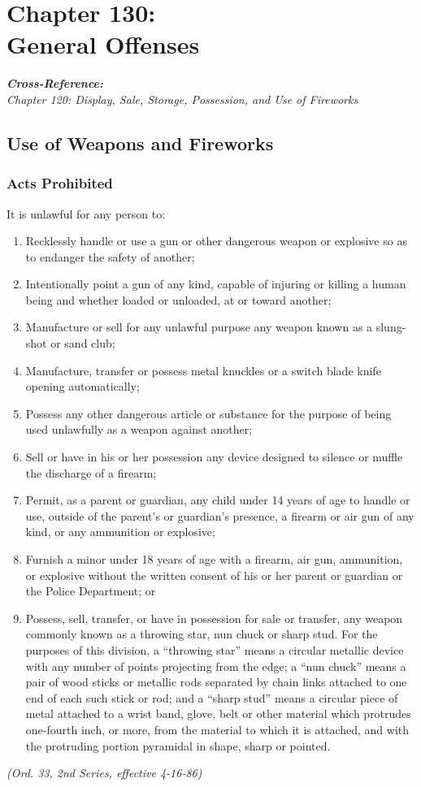 \chapter*{Chapter 130: \\
	General Offenses}
    \minitoc
    \emph{\textbf{Cross-Reference:}\\
        {\indent}Chapter 120: Display, Sale, Storage, Possession, and Use of Fireworks}\\
    \pagebreak

\section{Use of Weapons and Fireworks}
\subsection{Acts Prohibited}
It is unlawful for any person to:
\begin{enumerate}[{\indent}1)]
    \item Recklessly handle or use a gun or other dangerous weapon or explosive so as to endanger the safety of another;
    \item Intentionally point a gun of any kind, capable of injuring or killing a human being and whether loaded or unloaded, at or toward another;
    \item Manufacture or sell for any unlawful purpose any weapon known as a slung-shot or sand club;
    \item Manufacture, transfer or possess metal knuckles or a switch blade knife opening automatically;
    \item Possess any other dangerous article or substance for the purpose of being used unlawfully as a weapon against another;
    \item Sell or have in his or her possession any device designed to silence or muffle the discharge of a firearm;
    \item Permit, as a parent or guardian, any child under 14 years of age to handle or use, outside of the parent’s or guardian’s presence, a firearm or air gun of any kind, or any ammunition or explosive;
    \item Furnish a minor under 18 years of age with a firearm, air gun, ammunition, or explosive without the written consent of his or her parent or guardian or the Police Department; or
    \item Possess, sell, transfer, or have in possession for sale or transfer, any weapon commonly known as a throwing star, nun chuck or sharp stud.  For the purposes of this division,  a “throwing star” means a circular metallic device with any number of points projecting from the edge; a “nun chuck” means a pair of wood sticks or metallic rods separated by chain links attached to one end of each such stick or rod; and a “sharp stud” means a circular piece of metal attached to a wrist band, glove, belt or other material which protrudes one-fourth inch, or more, from the material to which it is attached, and with the protruding portion pyramidal in shape, sharp or pointed.
\end{enumerate}
\emph{(Ord. 33, 2nd Series, effective 4-16-86)}
